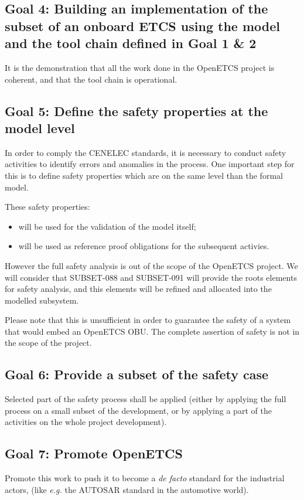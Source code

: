 \documentclass{template/openetcs_article}
\begin{document}
\subsection{Goal 4: Building an implementation of the subset of an onboard ETCS using the model and the 
tool chain defined in Goal 1 \& 2}

It is the demonstration that all the work done in the OpenETCS project is coherent, and that
the tool chain is operational.

\subsection{Goal 5: Define the safety properties at the model level}
In order to comply the CENELEC standards, it is necessary to conduct safety activities 
to identify errors and anomalies in the process. One important step for this is to define safety 
properties which are on the same level than the formal model.

These safety properties:
\begin{itemize}
\item will be used for the validation of the model itself;
\item will be used as reference proof obligations for the subsequent activies.
\end{itemize}

However the full safety analysis is out of the scope of the OpenETCS project. 
We will consider that SUBSET-088 and SUBSET-091 will provide the roots 
elements for safety analysis, and this elements will be refined and allocated into the modelled 
subsystem. 

Please note that this is unsufficient in order to guarantee the safety of a system that would embed an OpenETCS 
OBU. The complete assertion of safety is not in the scope of the project.

\subsection{Goal 6: Provide a subset of the safety case}
Selected part of the safety process shall be applied (either by applying the full process on a small
subset of the development, or by applying a part of the activities on the whole project development).

\subsection{Goal 7: Promote OpenETCS}
Promote this work to push it to become a \emph{de facto} standard for the industrial actors, 
(like \emph{e.g.} the AUTOSAR standard in the automotive world).
\end{document}
